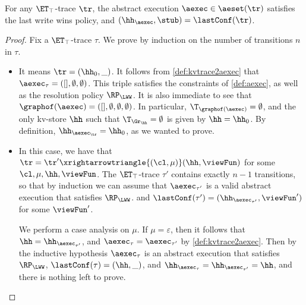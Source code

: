 \begin{proposition}
\label{prop:kvtrace2aexec}
For any $\ET_{\top}$-trace $\tr$, 
the abstract execution $\aexec \in \aeset(\tr)$ satisfies the last write wins policy,
and $(\hh_{\aexec}, \stub) = \lastConf(\tr)$.
\end{proposition}
\begin{proof}
Fix a $\ET_{\top}$-trace $\tau$. 
We prove by induction on the number of transitions $n$ in $\tau$. 
\begin{itemize}
\item {}
It means $\tr = (\hh_{0}, \_)$.
It follows from \cref{def:kvtrace2aexec} that $\aexec_{\tau} = ([], \emptyset, \emptyset)$. 
This triple satisfies the constraints of \cref{def:aexec}, as well as the resolution policy $\RP_{\LWW}$. 
It is also immediate to see that $\graphof(\aexec) = ([], \emptyset, \emptyset, \emptyset)$.
In particular, $\T_{\graphof(\aexec)} = \emptyset$, 
and the only kv-store $\hh$ such that $\T_{\Gr_{\hh}} = \emptyset$ 
is given by $\hh = \hh_{0}$. 
By definition, $\hh_{\aexec_{\tr}} = \hh_{0}$, as we wanted to prove.

\item {} In this case, we have that $\tr = \tr' \xrightarrowtriangle{(\cl, \mu)} (\hh, \viewFun)$ 
for some $\cl, \mu, \hh, \viewFun$. The $\ET_{\top}$-trace $\tau'$ contains exactly $n-1$ transitions, 
so that by induction we can assume that $\aexec_{\tau'}$ is a valid abstract execution that satisfies 
$\RP_{\LWW}$. and $\lastConf(\tau') = (\hh_{\aexec_{\tau'}}, \viewFun')$ for some $\viewFun'$. 

We perform a case analysis on $\mu$. 
If $\mu = \varepsilon$, then it follows that $\hh = \hh_{\aexec_{\tau'}}$, 
and $\aexec_{\tau} = \aexec_{\tau'}$ by \cref{def:kvtrace2aexec}. 
Then by the inductive hypothesis $\aexec_{\tau}$ is an abstract execution that satisfies $\RP_{\LWW}$,
$\lastConf(\tau) = (\hh, \_)$, and $\hh_{\aexec_{\tau}} = \hh_{\aexec_{\tau'}} = \hh$, 
and there is nothing left to prove. 


\end{itemize}
\end{proof}
